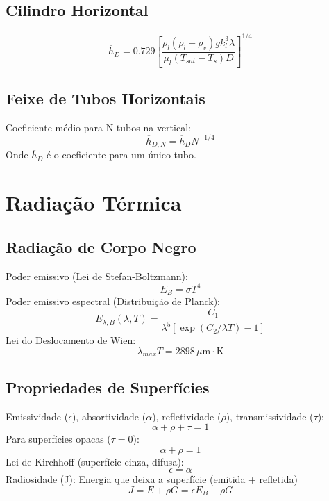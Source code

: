 \documentclass[12pt, a4paper]{article}
\begin{document}
\subsection{Cilindro Horizontal}
\begin{equation}
    \overline{h}_D = 0.729 \left[ \frac{\rho_l (\rho_l - \rho_v) g k_l^3 \lambda}{\mu_l (T_{sat} - T_s)D} \right]^{1/4}
\end{equation}

\subsection{Feixe de Tubos Horizontais}
Coeficiente médio para N tubos na vertical:
\begin{equation}
    \overline{h}_{D,N} = \overline{h}_D N^{-1/4}
\end{equation}
Onde $\overline{h}_D$ é o coeficiente para um único tubo.

\newpage

\section{Radiação Térmica}

\subsection{Radiação de Corpo Negro}
Poder emissivo (Lei de Stefan-Boltzmann):
\begin{equation}
    E_B = \sigma T^4
\end{equation}
Poder emissivo espectral (Distribuição de Planck):
\begin{equation}
    E_{\lambda,B}(\lambda, T) = \frac{C_1}{\lambda^5[\exp(C_2/\lambda T) - 1]}
\end{equation}
Lei do Deslocamento de Wien:
\begin{equation}
    \lambda_{max} T = 2898 \, \mu\text{m} \cdot \text{K}
\end{equation}

\subsection{Propriedades de Superfícies}
Emissividade ($\epsilon$), absortividade ($\alpha$), refletividade ($\rho$), transmissividade ($\tau$):
\begin{equation}
    \alpha + \rho + \tau = 1
\end{equation}
Para superfícies opacas ($\tau=0$):
\begin{equation}
    \alpha + \rho = 1
\end{equation}
Lei de Kirchhoff (superfície cinza, difusa):
\begin{equation}
    \epsilon = \alpha
\end{equation}
Radiosidade (J): Energia que deixa a superfície (emitida + refletida)
\begin{equation}
    J = E + \rho G = \epsilon E_B + \rho G
\end{equation}
\end{document}
